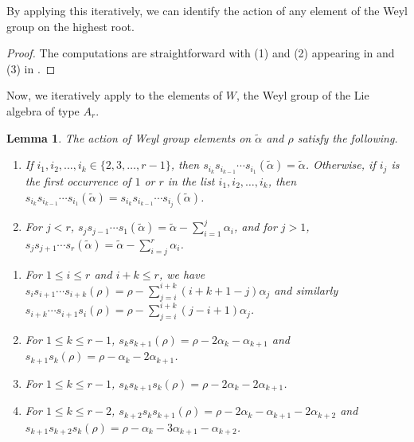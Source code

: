 \documentclass{amsart}
\newtheorem{lemma}[theorem]{Lemma}
\theoremstyle{definition}
\newcommand{\hroot}{\tilde{\alpha}}
\begin{document}
By applying this iteratively, we can identify the action of any element of the Weyl group on the highest root.
\begin{proof}
The computations are straightforward with (1) and (2) appearing in \cite[Lemma 3.1]{Lauren} and (3)  in \cite[Lemma 3.2]{Lauren}.
 \end{proof}


Now, we iteratively apply  to the elements of $W$, the Weyl group of the Lie algebra of type $A_r$.

\begin{lemma}\label{lem:LargerComputations}
The action of Weyl group elements on $\hroot$ and $\rho$ satisfy the following.
\begin{enumerate}
    \item If $i_1, i_2,\ldots,i_k \in \{2,3,\ldots,r-1\}$, then $s_{i_k}s_{i_{k-1}}\cdots s_{i_1}(\tilde{\alpha}) = \tilde{\alpha}$.
    Otherwise, if $i_j$ is the first occurrence of $1$ or $r$ in the list $i_1,i_2,\ldots,i_k$, then $s_{i_k}s_{i_{k-1}} \cdots s_{i_1}(\tilde{\alpha}) = s_{i_k}s_{i_{k-1}} \cdots s_{i_j}(\tilde{\alpha})$.
    \item For $j < r$, $s_j s_{j-1} \cdots s_1(\tilde{\alpha}) = \tilde{\alpha} - \sum_{i=1}^j \alpha_i$, and for $j > 1$, $s_js_{j+1}\cdots s_r(\tilde{\alpha}) = \tilde{\alpha} - \sum_{i=j}^{r} \alpha_i$.
\end{enumerate}
\begin{enumerate}
    \item[(3)] For $1\leq i\leq r$ and $i+k\leq r$, we have $s_{i}s_{i+1} \cdots s_{i+k}(\rho) = \rho - \sum_{j=i}^{i+k} (i+k+1-j)  \alpha_j $ and similarly $s_{i+k} \cdots s_{i+1} s_{i}(\rho) = \rho - \sum_{j = i}^{i+k} (j-i+1)\alpha_j $.
    \item[(4)] For $1\leq k\leq r-1$, 
    $s_ks_{k+1}(\rho) = \rho - 2 \alpha_k - \alpha_{k+1}$ and $s_{k+1}s_k(\rho) = \rho -  \alpha_k - 2 \alpha_{k+1}$.
    \item[(5)] For $1\leq k\leq r-1$, 
    $s_ks_{k+1}s_k(\rho) = \rho - 2 \alpha_k - 2\alpha_{k+1}$.
    \item[(6)] For $1\leq k\leq r-2$, 
    $s_{k+2}s_ks_{k+1}(\rho) = \rho - 2 \alpha_k - \alpha_{k+1} - 2\alpha_{k+2}$ and $s_{k+1}s_{k+2}s_k(\rho) = \rho - \alpha_k - 3 \alpha_{k+1} - \alpha_{k+2}$.
\end{enumerate}
\end{lemma}
\end{document}
